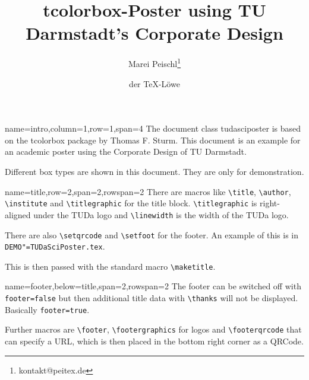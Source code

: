 \documentclass[
	english,%
	accentcolor=9c,%
]{tudasciposter}
\newcommand*{\file}[1]{\texttt{#1}}
\newcommand*{\code}[1]{\texttt{#1}}
\newcommand*{\pkg}[1]{\textsf{#1}}
\newcommand*{\cls}[1]{\textsf{#1}}
\newcommand{\tbs}{\textbackslash}
\newcommand*{\macro}[1]{\code{\tbs#1}}
\begin{document}
\title{\pkg{tcolorbox}-Poster using TU Darmstadt's Corporate Design}
\author{Marei Peischl\inst{*}\thanks{kontakt@peitex.de} \and der \TeX-Löwe}


\begin{tcbposter}[
	poster={
		columns=4,
		rows=7,
		spacing=1cm,
	},
]

\begin{posterboxenv}[title=Intro]{name=intro,column=1,row=1,span=4}
	The document class \cls{tudasciposter} is based on the \pkg{tcolorbox} package by Thomas F. Sturm.
	This document is an example for an academic poster using the Corporate Design of TU Darmstadt.

	Different box types are shown in this document. They are only for demonstration.
\end{posterboxenv}

\begin{posterboxenv}[title=Title]{name=title,row=2,span=2,rowspan=2}
	There are macros like \macro{title}, \macro{author}, \macro{institute} and \macro{titlegraphic} for the title block.
	\macro{titlegraphic} is right-aligned under the TUDa logo and
	\macro{linewidth} is the width of the TUDa logo.

	There are also \macro{setqrcode} and \macro{setfoot} for the footer. An example of this is in \file{DEMO"=TUDaSciPoster.tex}.

	This is then passed with the standard macro \macro{maketitle}.
\end{posterboxenv}

\begin{posterboxenv}[title=Footer]{name=footer,below=title,span=2,rowspan=2}
	The footer can be switched off with \code{footer=false} but then additional title data with \macro{thanks} will not be displayed. Basically \code{footer=true}.

	Further macros are \macro{footer}, \macro{footergraphics} for logos and \macro{footerqrcode} that can specify a URL, which is then placed in the bottom right corner as a QRCode.


\end{posterboxenv}
\end{tcbposter}
\end{document}
